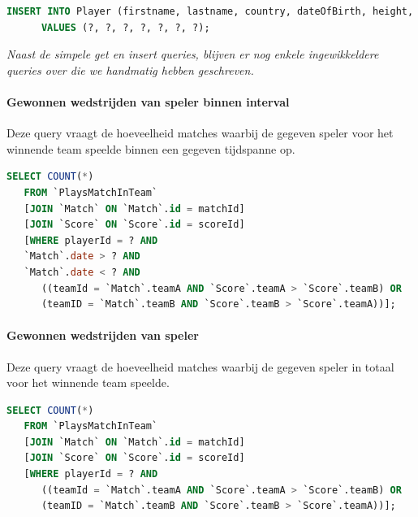 \documentclass[11pt]{article}
\begin{document}
  \begin{framed}
  \begin{lstlisting}[language=sql]
      INSERT INTO Player (firstname, lastname, country, dateOfBirth, height, weight, position)
      VALUES (?, ?, ?, ?, ?, ?, ?);
  \end{lstlisting}
  \end{framed}


\emph{Naast de simpele get en insert queries, blijven er nog enkele ingewikkeldere queries over die we handmatig hebben geschreven.}


\paragraph{Gewonnen wedstrijden van speler binnen interval}

  Deze query vraagt de hoeveelheid matches waarbij de gegeven speler voor het winnende team speelde binnen een gegeven tijdspanne op.

  \begin{framed}
  \begin{lstlisting}[language=sql]
  SELECT COUNT(*)
   FROM `PlaysMatchInTeam`
   [JOIN `Match` ON `Match`.id = matchId]
   [JOIN `Score` ON `Score`.id = scoreId]
   [WHERE playerId = ? AND
   `Match`.date > ? AND
   `Match`.date < ? AND
      ((teamId = `Match`.teamA AND `Score`.teamA > `Score`.teamB) OR
      (teamID = `Match`.teamB AND `Score`.teamB > `Score`.teamA))];
  \end{lstlisting}
  \end{framed}


\paragraph{Gewonnen wedstrijden van speler}

  Deze query vraagt de hoeveelheid matches waarbij de gegeven speler in totaal voor het winnende team speelde.

  \begin{framed}
  \begin{lstlisting}[language=sql]
  SELECT COUNT(*)
   FROM `PlaysMatchInTeam`
   [JOIN `Match` ON `Match`.id = matchId]
   [JOIN `Score` ON `Score`.id = scoreId]
   [WHERE playerId = ? AND
      ((teamId = `Match`.teamA AND `Score`.teamA > `Score`.teamB) OR
      (teamID = `Match`.teamB AND `Score`.teamB > `Score`.teamA))];
  \end{lstlisting}
  \end{framed}
\end{document}
